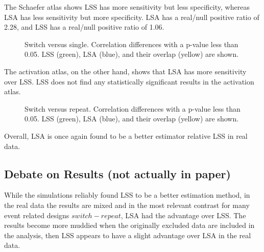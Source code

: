 \documentclass[10pt,letterpaper]{article}
\begin{document}
The Schaefer atlas shows LSS has more sensitivity but less specificity, whereas LSA
has less sensitivity but more specificity.
LSA has a real/null positive ratio of 2.28, and LSS has a real/null
positive ratio of 1.06.

\begin{figure}[H]
  \centering
  \caption{
    Switch versus single. Correlation differences with a p-value less than 0.05.
    LSS (green), LSA (blue), and their overlap (yellow) are shown.
  }
  \label{fig:sch_switchvrepeat}
\end{figure}

The activation atlas, on the other hand, shows that LSA has more sensitivity over LSS.
LSS does not find any statistically significant results in the activation atlas.
\begin{figure}[H]
  \centering
  \qquad
  \caption{
    Switch versus repeat. Correlation differences with a p-value less than 0.05.
    LSS (green), LSA (blue), and their overlap (yellow) are shown.
  }
  \label{fig:act_switchvrepeat}
\end{figure}

Overall, LSA is once again found to be a better estimator relative LSS in real data.

\subsection*{Debate on Results (not actually in paper)}
While the simulations reliably found LSS to be a better estimation method,
in the real data the results are mixed and in the most relevant contrast for
many event related designs $switch - repeat$,
LSA had the advantage over LSS.
The results become more muddied when the originally excluded data are included
in the analysis, then LSS appears to have a slight advantage over LSA in the
real data.
\end{document}
